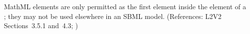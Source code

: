 MathML  elements are only permitted as the first element
inside the  element of a \FunctionDefinition; they may not be
used elsewhere in an SBML model.  (References: L2V2 Sections~3.5.1 and~4.3;
)

